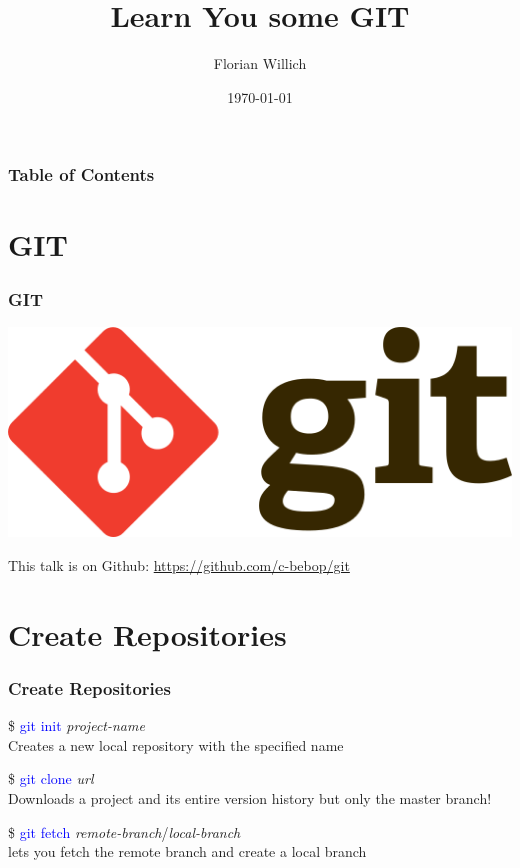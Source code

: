 \documentclass[aspectratio=169]{beamer}
\title[Learn You some GIT] %
{Learn You some GIT}
\author[Florian Willich]{Florian Willich}
\institute[BIT]
{
  Quality and Usability Lab\\
  Berlin Institute of Technology
}
\date{\today}
\begin{document}
\frame{\titlepage}

\begin{frame}
\frametitle{Table of Contents}
\tableofcontents
\end{frame}

\section{GIT}
\begin{frame}

\frametitle{GIT}

\begin{center}
\includegraphics*[scale=0.5]{images/Git-logo.png}

This talk is on Github: \hyperlink{https://github.com/c-bebop/git}{https://github.com/c-bebop/git}
\end{center}

\end{frame}

\section{Create Repositories}
\begin{frame}

\frametitle{Create Repositories}

\$ \textcolor{blue}{git init} \textit{project-name}\\
Creates a new local repository with the specified name

\pause

\$ \textcolor{blue}{git clone} \textit{url}\\
Downloads a project and its entire version history but only the master branch!

\pause

\$ \textcolor{blue}{git fetch} \textit{remote-branch}/\textit{local-branch}\\
lets you fetch the remote branch and create a local branch

\end{frame}
\end{document}
